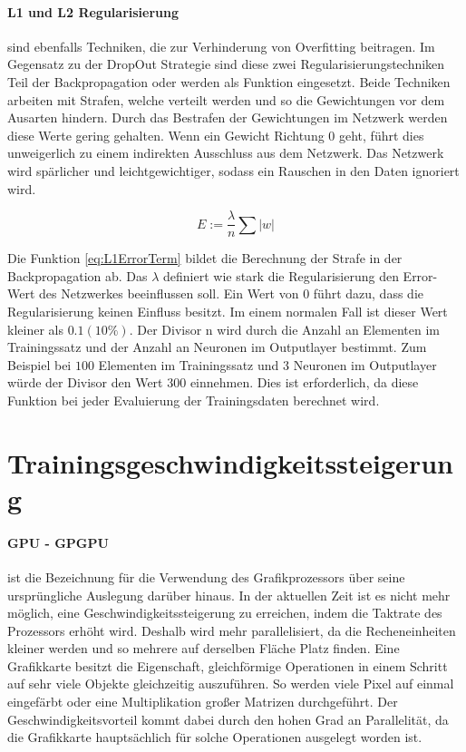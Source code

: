 \paragraph{L1 und L2 Regularisierung} sind ebenfalls Techniken, die zur Verhinderung von Overfitting beitragen.
Im Gegensatz zu der DropOut Strategie sind diese zwei Regularisierungstechniken Teil der Backpropagation oder werden als Funktion eingesetzt.
Beide Techniken arbeiten mit Strafen, welche verteilt werden und so die Gewichtungen vor dem Ausarten hindern. 
Durch das Bestrafen der Gewichtungen im Netzwerk werden diese Werte gering gehalten. 
Wenn ein Gewicht Richtung $0$ geht, führt dies unweigerlich zu einem indirekten Ausschluss aus dem Netzwerk. 
Das Netzwerk wird spärlicher und leichtgewichtiger, sodass ein Rauschen in den Daten ignoriert wird. 

\begin{equation}
	E := \frac{\lambda}{n} \sum |w|
	\label{eq:L1ErrorTerm}
\end{equation}

\noindent
Die Funktion \ref{eq:L1ErrorTerm} bildet die Berechnung der Strafe in der Backpropagation ab.
Das $\lambda$ definiert wie stark die Regularisierung den Error-Wert des Netzwerkes beeinflussen soll.
Ein Wert von $0$ führt dazu, dass die Regularisierung keinen Einfluss besitzt. 
Im einem normalen Fall ist dieser Wert kleiner als $0.1 (10\%)$.
Der Divisor n wird durch die Anzahl an Elementen im Trainingssatz und der Anzahl an Neuronen im Outputlayer bestimmt.
Zum Beispiel bei $100$ Elementen im Trainingssatz und $3$ Neuronen im Outputlayer würde der Divisor den Wert $300$ einnehmen.
Dies ist erforderlich, da diese Funktion bei jeder Evaluierung der Trainingsdaten berechnet wird.

\section{Trainingsgeschwindigkeitssteigerung}

\paragraph{GPU - GPGPU} ist die Bezeichnung für die Verwendung des Grafikprozessors über seine ursprüngliche Auslegung darüber hinaus.
In der aktuellen Zeit ist es nicht mehr möglich, eine Geschwindigkeitssteigerung zu erreichen, indem die Taktrate des Prozessors erhöht wird. 
Deshalb wird mehr parallelisiert, da die Recheneinheiten kleiner werden und so mehrere auf derselben Fläche Platz finden. 
Eine Grafikkarte besitzt die Eigenschaft, gleichförmige Operationen in einem Schritt auf sehr viele Objekte gleichzeitig auszuführen. 
So werden viele Pixel auf einmal eingefärbt oder eine Multiplikation großer Matrizen durchgeführt. 
Der Geschwindigkeitsvorteil kommt dabei durch den hohen Grad an Parallelität, da die Grafikkarte hauptsächlich für solche Operationen ausgelegt worden ist.

